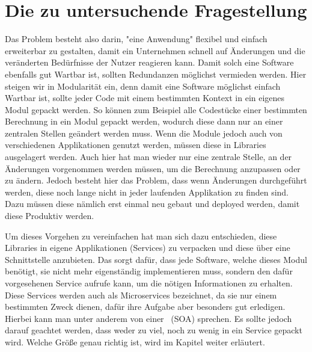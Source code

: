 \section{Die zu untersuchende Fragestellung}
\label{sec:dasProblem}
Das Problem besteht also darin, "eine Anwendung" flexibel und einfach erweiterbar zu gestalten, damit ein Unternehmen schnell auf Änderungen und die veränderten Bedürfnisse der Nutzer reagieren kann. Damit solch eine Software ebenfalls gut Wartbar ist, sollten Redundanzen möglichst vermieden werden. Hier steigen wir in Modularität ein, denn damit eine Software möglichst einfach Wartbar ist, sollte jeder Code mit einem bestimmten Kontext in ein eigenes Modul gepackt werden. So können zum Beispiel alle Codestücke einer bestimmten Berechnung in ein Modul gepackt werden, wodurch diese dann nur an einer zentralen Stellen geändert werden muss. Wenn die Module jedoch auch von verschiedenen Applikationen genutzt werden, müssen diese in Libraries ausgelagert werden. Auch hier hat man wieder nur eine zentrale Stelle, an der Änderungen vorgenommen werden müssen, um die Berechnung anzupassen oder zu ändern. Jedoch besteht hier das Problem, dass wenn Änderungen durchgeführt werden, diese noch lange nicht in jeder laufenden Applikation zu finden sind. Dazu müssen diese nämlich erst einmal neu gebaut und deployed werden, damit diese Produktiv werden.

Um dieses Vorgehen zu vereinfachen hat man sich dazu entschieden, diese Libraries in eigene Applikationen (Services) zu verpacken und diese über eine Schnittstelle anzubieten. Das sorgt dafür, dass jede Software, welche dieses Modul benötigt, sie nicht mehr eigenständig implementieren muss, sondern den dafür vorgesehenen Service aufrufe kann, um die nötigen Informationen zu erhalten. Diese Services werden auch als Microservices bezeichnet, da sie nur einem bestimmten Zweck dienen, dafür ihre Aufgabe aber besonders gut erledigen. Hierbei kann man unter anderem von einer \SOA\ (SOA) sprechen. Es sollte jedoch darauf geachtet werden, dass weder zu viel, noch zu wenig in ein Service gepackt wird. Welche Größe genau richtig ist, wird im Kapitel  weiter erläutert.

